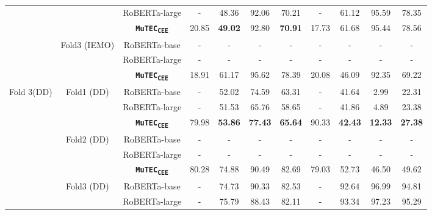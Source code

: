 \documentclass{article}
\newcommand{\subtwo}{\textbf{\texttt{MuTEC\textsubscript{CEE}}}}
\begin{document}
{\begin{table*}[t]
{\begin{tabular}{|c|c|c|c|c|c|c|c|c|c|c|}
                             &                               & RoBERTa-large & -     & 48.36 & 92.06 & 70.21 & -     & 61.12 & 95.59 & 78.35 \\ \cline{3-11} 
                             &                               & \subtwo          & 20.85 & \textbf{49.02} & 92.80 & \textbf{70.91} & 17.73 & 61.68 & 95.44 & 78.56 \\ \cline{2-11} 
                             & \multirow{3}{*}{Fold3 (IEMO)} & RoBERTa-base  & -     & -     & -     & -     & -     & -     & -     & -     \\ \cline{3-11} 
                             &                               & RoBERTa-large & -     & -     & -     & -     & -     & -     & -     & -     \\ \cline{3-11} 
                             &                               & \subtwo          & 18.91 & 61.17 & 95.62 & 78.39 & 20.08 & 46.09 & 92.35 & 69.22 \\ \hline
\multirow{18}{*}{Fold 3(DD)} & \multirow{3}{*}{Fold1 (DD)}   & RoBERTa-base  & -     & 52.02 & 74.59 & 63.31 & -     & 41.64 & 2.99  & 22.31 \\ \cline{3-11} 
                             &                               & RoBERTa-large & -     & 51.53 & 65.76 & 58.65 & -     & 41.86 & 4.89  & 23.38 \\ \cline{3-11} 
                             &                               & \subtwo          & 79.98 & \textbf{53.86} & \textbf{77.43} & \textbf{65.64} & 90.33 & \textbf{42.43} & \textbf{12.33} & \textbf{27.38} \\ \cline{2-11} 
                             & \multirow{3}{*}{Fold2 (DD)}   & RoBERTa-base  & -     & -     & -     & -     & -     & -     & -     & -     \\ \cline{3-11} 
                             &                               & RoBERTa-large & -     & -     & -     & -     & -     & -     & -     & -     \\ \cline{3-11} 
                             &                               & \subtwo          & 80.28 & 74.88 & 90.49 & 82.69 & 79.03 & 52.73 & 46.50 & 49.62 \\ \cline{2-11} 
                             & \multirow{3}{*}{Fold3 (DD)}   & RoBERTa-base  & -     & 74.73 & 90.33 & 82.53 & -     & 92.64 & 96.99 & 94.81 \\ \cline{3-11} 
                             &                               & RoBERTa-large & -     & 75.79 & 88.43 & 82.11 & -     & 93.34 & 97.23 & 95.29 \\ \cline{3-11} 

\end{tabular}}
\end{table*}}
\end{document}
